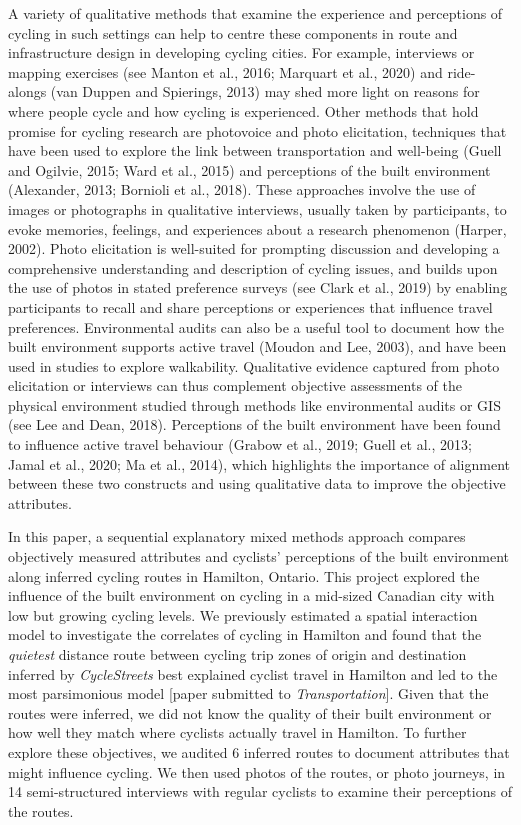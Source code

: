 \documentclass[]{elsarticle} %
\begin{document}
A variety of qualitative methods that examine the experience and
perceptions of cycling in such settings can help to centre these
components in route and infrastructure design in developing cycling
cities. For example, interviews or mapping exercises (see Manton et al.,
2016; Marquart et al., 2020) and ride-alongs (van Duppen and Spierings,
2013) may shed more light on reasons for where people cycle and how
cycling is experienced. Other methods that hold promise for cycling
research are photovoice and photo elicitation, techniques that have been
used to explore the link between transportation and well-being (Guell
and Ogilvie, 2015; Ward et al., 2015) and perceptions of the built
environment (Alexander, 2013; Bornioli et al., 2018). These approaches
involve the use of images or photographs in qualitative interviews,
usually taken by participants, to evoke memories, feelings, and
experiences about a research phenomenon (Harper, 2002). Photo
elicitation is well-suited for prompting discussion and developing a
comprehensive understanding and description of cycling issues, and
builds upon the use of photos in stated preference surveys (see Clark et
al., 2019) by enabling participants to recall and share perceptions or
experiences that influence travel preferences. Environmental audits can
also be a useful tool to document how the built environment supports
active travel (Moudon and Lee, 2003), and have been used in studies to
explore walkability. Qualitative evidence captured from photo
elicitation or interviews can thus complement objective assessments of
the physical environment studied through methods like environmental
audits or GIS (see Lee and Dean, 2018). Perceptions of the built
environment have been found to influence active travel behaviour (Grabow
et al., 2019; Guell et al., 2013; Jamal et al., 2020; Ma et al., 2014),
which highlights the importance of alignment between these two
constructs and using qualitative data to improve the objective
attributes.

In this paper, a sequential explanatory mixed methods approach compares
objectively measured attributes and cyclists' perceptions of the built
environment along inferred cycling routes in Hamilton, Ontario. This
project explored the influence of the built environment on cycling in a
mid-sized Canadian city with low but growing cycling levels. We
previously estimated a spatial interaction model to investigate the
correlates of cycling in Hamilton and found that the \emph{quietest}
distance route between cycling trip zones of origin and destination
inferred by \emph{CycleStreets} best explained cyclist travel in
Hamilton and led to the most parsimonious model {[}paper submitted to
\emph{Transportation}{]}. Given that the routes were inferred, we did
not know the quality of their built environment or how well they match
where cyclists actually travel in Hamilton. To further explore these
objectives, we audited 6 inferred routes to document attributes that
might influence cycling. We then used photos of the routes, or photo
journeys, in 14 semi-structured interviews with regular cyclists to
examine their perceptions of the routes.
\end{document}
